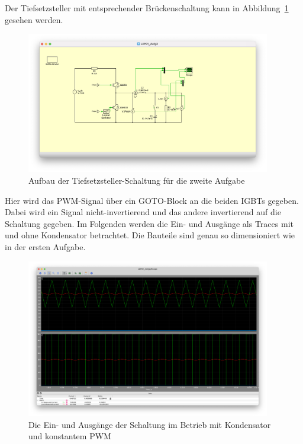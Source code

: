 \documentclass{report}
\begin{document}
Der Tiefsetzsteller mit entsprechender Brückenschaltung kann in Abbildung~\ref{fig:aufg2_aufbau} gesehen werden.

\begin{figure}[hbt!]
	\begin{center}
		\includegraphics[width=0.95\textwidth]{assets/img/aufg2_aufbau.png}
	\end{center}
	\caption{Aufbau der Tiefsetzsteller-Schaltung für die zweite Aufgabe}
	\label{fig:aufg2_aufbau}
\end{figure}

Hier wird das PWM-Signal über ein GOTO-Block an die beiden IGBTs gegeben. Dabei wird ein Signal nicht-invertierend und das andere invertierend auf die Schaltung gegeben. Im Folgenden werden die Ein- und Ausgänge als Traces mit und ohne Kondensator betrachtet. Die Bauteile sind genau so dimensioniert wie in der ersten Aufgabe.

\begin{figure}[hbt!]
	\begin{center}
		\includegraphics[width=0.95\textwidth]{assets/img/aufg2_eingang_ausgang_c_wc.png}
	\end{center}
	\caption{Die Ein- und Ausgänge der Schaltung im Betrieb mit Kondensator und konstantem PWM}
	\label{fig:aufg2_eingang_ausgang_c_wc}
\end{figure}
\end{document}
